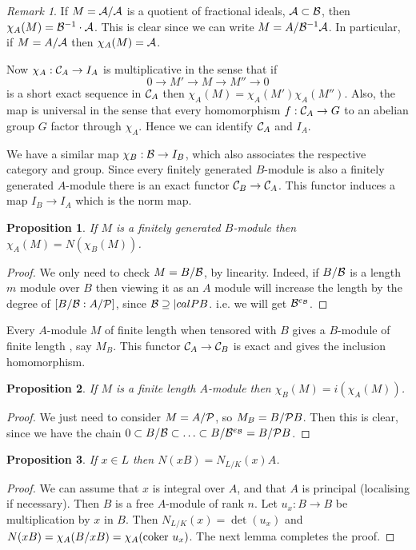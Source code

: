 \documentclass[11pt]{article} %
\newtheorem{prop}{Proposition}
\theoremstyle{remark}\newtheorem*{rem}{Remark}
\begin{document}
\begin{rem}
 If $M=\cal A / A$ is a quotient of fractional ideals, ${\cal A} \subset \cal B$, then $\chi_A(M) = {\cal B}^{-1}\cdot \cal A$.
 This is clear since we can write $M = A/{\cal B}^{-1}\cal A$.
 In particular, if $M= A/\cal A$ then $\chi_A(M) = \cal A$.
\end{rem}

Now $\chi_A :{\cal C}_A \rightarrow  I_A$ is multiplicative in the sense that if
\[
 0\rightarrow M' \rightarrow M \rightarrow M'' \rightarrow 0
\]
is a short exact sequence in ${\cal C}_A$ then $\chi_A(M) = \chi_A(M')\chi_A(M'')$.
Also, the map is universal in the sense that every homomorphism $f:{\cal C}_A \rightarrow G$ to an abelian group $G$ factor through $\chi_A$.
Hence we can identify ${\cal C}_A$ and $I_A$.

We have a similar map $\chi_B:{\cal B}\rightarrow I_B$, which also associates the respective category and group.
Since every finitely generated $B$-module is also a finitely generated $A$-module there is an exact functor ${\cal C}_B\rightarrow {\cal C}_A$.
This functor induces a map $I_B\rightarrow I_A$ which is the norm map.
\begin{prop}
 If $M$ is a finitely generated $B$-module then $\chi_A(M) = N(\chi_B(M))$.
\end{prop}
\begin{proof}
 We only need to check $M=B/\cal B$, by linearity.
 Indeed, if $B/\cal B$ is a length $m$ module over $B$ then viewing it as an $A$ module will increase the length by the degree of $[B/{\cal B} : A/{\cal P}]$, since ${\cal B} \supseteq {|cal P}B$.
 i.e. we will get ${\cal B}^{e_{\cal B}}$. 
 \end{proof}
 
 Every $A$-module $M$ of finite length when tensored with $B$ gives a $B$-module of finite length , say $M_B$.
 This functor ${\cal C}_A\rightarrow {\cal C}_B$ is exact and gives the inclusion homomorphism.
 
 \begin{prop}
  If $M$ is a finite length $A$-module then $\chi_B(M) = i(\chi_A(M))$.
 \end{prop}
\begin{proof}
 We just need to consider $M=A/\cal P$, so $M_B = B/{\cal P} B$.
 Then this is clear, since we have the chain $0\subset B/{\cal B} \subset \ldots \subset B/{\cal B}^{e_{\cal B}} = B/{\cal P}B$.
\end{proof}

\begin{prop}
 If $x\in L$ then $N(xB) = N_{L/K}(x)A$.
\end{prop}
\begin{proof}
 We can assume that $x$ is integral over $A$, and that $A$ is principal (localising if necessary).
 Then $B$ is a free $A$-module of rank $n$.
 Let $u_x:B\rightarrow B$ be multiplication by $x$ in $B$.
 Then $N_{L/K} (x) = \det (u_x)$ and $N(xB) = \chi_A(B/xB) = \chi_A ({\rm coker }\ u_x)$.
 The next lemma completes the proof.
\end{proof}
\end{document}
